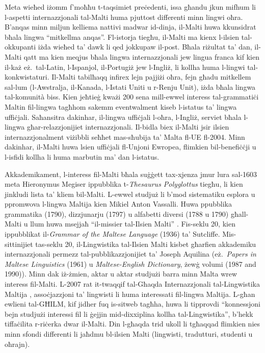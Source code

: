 \begin{multicols}{2}
Meta wieħed iżomm f’moħħu t-taqsimiet preċedenti, issa għandu jkun mifhum li l-aspetti internazzjonali tal-Malti huma pjuttost differenti minn lingwi oħra. B’anqas minn miljun kelliema nattivi madwar id-dinja, il-Malti huwa kkunsidrat bħala lingwa ``mitkellma anqas''. Fl-istorja tiegħu, il-Malti ma kienx l-ilsien tal-okkupanti iżda wieħed ta’ dawk li qed jokkupaw il-post. Bħala riżultat ta’ dan, il-Malti qatt ma kien meqjus bħala lingwa internazzjonali jew lingua franca kif kien il-każ eż.~tal-Latin, l-Ispanjol, il-Portugiż jew l-Ingliż, li kollha huma l-lingwi tal-konkwistaturi. Il-Malti tabilħaqq infirex lejn pajjiżi oħra, fejn għadu mitkellem sal-lum (l-Awstralja, il-Kanada, l-Istati Uniti u r-Renju Unit), iżda bħala lingwa tal-komunità biss. Kien jeħtieġ kważi 200 sena mill-ewwel interess tal-grammatiċi Maltin fil-lingwa tagħhom sakemm eventwalment kiseb l-istatus ta’ lingwa uffiċjali. Saħansitra dakinhar, il-lingwa uffiċjali l-oħra, l-Ingliż, serviet bħala l-lingwa għar-relazzjonijiet internazzjonali.
Il-bidla biex il-Malti jsir ilsien internazzjonalment viżibbli seħħet mas-sħubija ta’ Malta fl-UE fl-2004. Minn dakinhar, il-Malti huwa lsien uffiċjali fl-Unjoni Ewropea, flimkien bil-benefiċċji u l-isfidi kollha li huma marbutin ma’ dan l-istatus.

Akkademikament, l-interess fil-Malti bħala suġġett tax-xjenza jmur lura sal-1603 meta Hieronymus Megiser ippubblika t-\emph{Thesaurus Polyglottus} tiegħu, li kien jinkludi lista ta’ kliem bil-Malti. L-ewwel studjuż li b’mod sistematiku esplora u ppromwova l-lingwa Maltija kien Mikiel Anton Vassalli. Huwa ppubblika grammatika (1790), dizzjunarju (1797) u alfabetti diversi (1788 u 1790) għall-Malti u llum huwa msejjaħ ``il-missier tal-Ilsien Malti'' \cite{Brincat:2011}. Fis-seklu 20, kien ippubblikat il-\emph{Grammar of the Maltese Language} (1936) ta’ Sutcliffe. Mis-sittinijiet tas-seklu 20, il-Lingwistika tal-Ilsien Malti kisbet għarfien akkademiku internazzjonali permezz tal-pubblikazzjonijiet ta’ Joseph Aquilina (eż.~\emph{Papers in Maltese Linguistics} (1961) u \emph{Maltese-English Dictionary}, żewġ volumi (1987 and 1990)).  Minn dak iż-żmien, aktar u aktar studjużi barra minn Malta wrew interess fil-Malti. L-2007 rat it-twaqqif tal-Għaqda Internazzjonali tal-Lingwistika Maltija \cite{GHILM1}, assoċjazzjoni ta’ lingwisti li huma interessati fil-lingwa Maltija. L-għan ewlieni tal-GĦILM, kif jidher fuq is-sitweb tagħha, huwa li tipprovdi ``konnessjoni bejn studjużi interessi fil li ġejjin mid-dixxiplina kollha tal-Lingwistika'', b'hekk tiffaċilita r-riċerka dwar il-Malti. Din l-għaqda trid ukoll li tgħaqqad flimkien nies minn sfondi differenti li jaħdmu bl-ilsien Malti (lingwisti, tradutturi, studenti u oħrajn).


\end{multicols}
